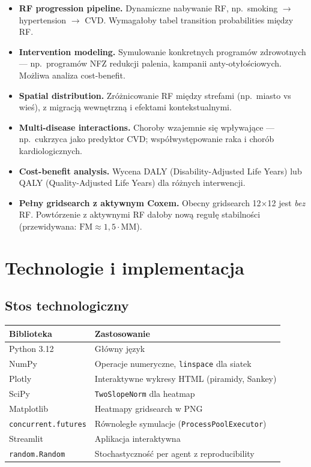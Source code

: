 \documentclass[11pt,a4paper]{article}
\begin{document}
\begin{itemize}[leftmargin=*]
  \item \textbf{RF progression pipeline.} Dynamiczne nabywanie RF, np.\ smoking $\to$ hypertension $\to$ CVD. Wymagałoby tabel transition probabilities między RF.

  \item \textbf{Intervention modeling.} Symulowanie konkretnych programów zdrowotnych --- np.\ programów NFZ redukcji palenia, kampanii anty-otyłościowych. Możliwa analiza cost-benefit.

  \item \textbf{Spatial distribution.} Zróżnicowanie RF między strefami (np.\ miasto vs wieś), z migracją wewnętrzną i efektami kontekstualnymi.

  \item \textbf{Multi-disease interactions.} Choroby wzajemnie się wpływające --- np.\ cukrzyca jako predyktor CVD; współwystępowanie raka i chorób kardiologicznych.

  \item \textbf{Cost-benefit analysis.} Wycena DALY (Disability-Adjusted Life Years) lub QALY (Quality-Adjusted Life Years) dla różnych interwencji.

  \item \textbf{Pełny gridsearch z aktywnym Coxem.} Obecny gridsearch 12×12 jest \emph{bez} RF. Powtórzenie z aktywnymi RF dałoby nową regułę stabilności (przewidywana: $\mathrm{FM} \approx 1{,}5 \cdot \mathrm{MM}$).
\end{itemize}

\newpage
\section{Technologie i implementacja}

\subsection{Stos technologiczny}

\begin{table}[h]
\centering
\small
\begin{tabular}{ll}
\toprule
\textbf{Biblioteka} & \textbf{Zastosowanie} \\
\midrule
Python 3.12 & Główny język \\
NumPy & Operacje numeryczne, \texttt{linspace} dla siatek \\
Plotly & Interaktywne wykresy HTML (piramidy, Sankey) \\
SciPy & \texttt{TwoSlopeNorm} dla heatmap \\
Matplotlib & Heatmapy gridsearch w PNG \\
\texttt{concurrent.futures} & Równoległe symulacje (\texttt{ProcessPoolExecutor}) \\
Streamlit & Aplikacja interaktywna \\
\texttt{random.Random} & Stochastyczność per agent z reproducibility \\
\bottomrule
\end{tabular}
\end{table}
\end{document}
